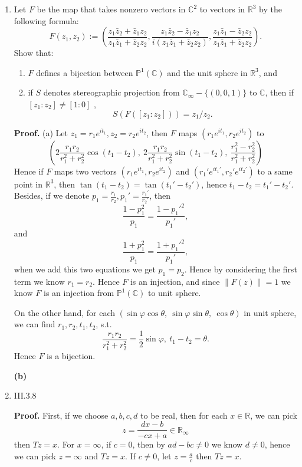 \documentclass{article}%
\begin{document}
\begin{enumerate}


\item Let $ F$ be the map that takes nonzero vectors in $ \mathbb{C}^2$ to vectors in $ \mathbb{R}^3$ by the following formula:
\[ F(z_{1},z_{2}) := \left(
\frac{z_{1}\bar{z}_{2} + \bar{z}_{1} z_{2}}{{z}_{1}\bar{z}_{1}+\bar{z}_2 z_2},\frac{z_{1}\bar{z}_{2} - \bar{z}_{1} z_{2}}{i({z}_{1}\bar{z}_{1}+\bar{z}_2 z_2)}, \frac{z_{1}\bar{z}_{1} - \bar{z}_{2} z_{2}}{{z}_{1}\bar{z}_{1}+\bar{z}_2 z_2}
\right) .
\]
Show that:

\begin{enumerate}
 
\item $ F$ defines a bijection between $ \mathbb{P}^1(\mathbb{C})$ and the unit sphere in $ \mathbb{R}^3$, and
\item if $S$ denotes stereographic projection from $\mathbb{C}_{\infty}-{\{(0,0,1)\}}$ to $\mathbb{C}$, then if $[z_1:z_2] \neq [1:0]$ , \[
S(F([z_1:z_2])) = z_1/z_2.
\]  
\end{enumerate}

\textbf{Proof.}
(a)
Let $z_1 = r_1e^{it_1}, z_2 = r_2e^{it_2} $, then $F$ maps $(r_1e^{it_1}, r_2e^{it_2})$ to
$$
\left(
2\frac{r_1r_2}{r_1^2+r_2^2}\cos(t_1-t_2), ~2\frac{r_1r_2}{r_1^2+r_2^2}\sin(t_1-t_2), ~\frac{r_1^2-r_2^2}{r_1^2+r_2^2}
\right)
$$
Hence if $F$ maps two vectors $(r_1e^{it_1}, r_2e^{it_2})$ and $(r_1'e^{it_1'}, r_2'e^{it_2'})$ to a same point in $\mathbb{R}^3 $, then $\tan(t_1-t_2) = \tan(t_1'-t_2')$, hence $t_1-t_2 = t_1'-t_2' $. Besides, if we denote $p_1 = \frac{r_1}{r_2}, p_1' = \frac{r_1'}{r_2'} $, then
$$
\frac{1-p_1^2}{p_1} = \frac{1-p_1'^2}{p_1'}, 
$$
and
$$
\frac{1+p_1^2}{p_1} = \frac{1+p_1'^2}{p_1'},
$$
when we add this two equations we get $p_1 = p_2 $. Hence by considering the first term we know $r_1 = r_2 $. Hence $F$ is an injection, and since $\lVert F(z) \rVert = 1$ we know $F$ is an injection from $\mathbb{P}^1(\mathbb{C}) $ to unit sphere.

On the other hand, for each $(\sin\varphi\cos\theta, ~\sin\varphi\sin\theta, ~\cos\theta)$ in unit sphere, we can find $r_1, r_2, t_1, t_2 $, s.t.
$$
\frac{r_1r_2}{r_1^2+r_2^2} = \frac{1}{2}\sin\varphi, ~t_1-t_2 = \theta.
$$
Hence $F$ is a bijection.

\textbf{(b)}



\item III.3.8

\textbf{Proof.}
First, if we choose $a, b, c, d$ to be real, then for each $x\in\mathbb{R}$, we can pick
$$
z = \frac{dx-b}{-cx+a}\in\mathbb{R}_{\infty}
$$
then $Tz = x$. For $x = \infty$, if $c = 0$, then by $ad-bc\ne 0$ we know $d\ne 0$, hence we can pick $z = \infty$ and $Tz = x$. If $c\ne 0$, let $z = \frac{a}{c}$ then $Tz = x$.


\end{enumerate}
\end{document}
